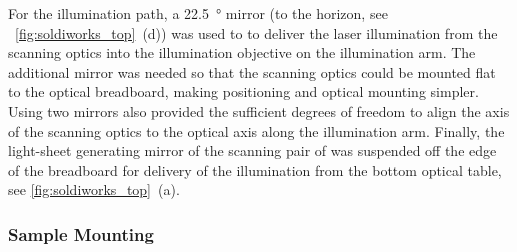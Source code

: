 For the illumination path, a \SI{22.5}{\degree} mirror
(to the horizon, see \figurename~\ref{fig:soldiworks_top}~(d))
was used to to deliver the laser illumination from the scanning optics into the illumination objective on the \gls{illumination arm}.
The additional mirror was needed so that the scanning optics could be mounted flat to the optical breadboard, making positioning and optical mounting simpler.
Using two mirrors also provided the sufficient degrees of freedom to align the axis of the scanning optics to the optical axis along the \gls{illumination arm}.
Finally, the light-sheet generating mirror of the scanning pair of was suspended off the edge of the breadboard for delivery of the  illumination from the bottom optical table, see \figurename\ref{fig:soldiworks_top}~(a).






\subsubsection{Sample Mounting}

